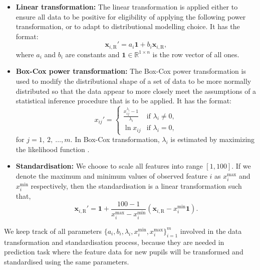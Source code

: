 \begin{itemize}
\item \textbf{Linear transformation:} The linear transformation is applied either to ensure all data to be positive for eligibility of applying the following power transformation, or to adapt to distributional modelling choice. It has the format:
\begin{equation}
\mathbf{x}_{i,\text{R}}' = a_i \mathbf{1} + b_i \mathbf{x}_{i,\text{R}},
\label{eq:linearTransformation}
\end{equation}
where $a_i$ and $b_i$ are constants and $\mathbf{1} \in \mathbb{R}^{1 \times n}$ is the row vector of all ones.
\item \textbf{Box-Cox power transformation:} The Box-Cox power transformation is used to modify the distributional shape of a set of data to be more normally distributed so that the data appear to more closely meet the assumptions of a statistical inference procedure that is to be applied. It has the format:
\begin{equation}
x_{ij}' = 
\begin{cases}
\frac{x_{ij}^{\lambda_i}-1}{\lambda_i} & \text{if } \lambda_i \neq 0, \\
\ln{x_{ij}} & \text{if } \lambda_i = 0,
\end{cases}
\end{equation}
for $j = 1, ~2, ~\dots, m$. In Box-Cox transformation, $\lambda_i$ is estimated by maximizing the likelihood function \cite{Box64ananalysis}.
\item \textbf{Standardisation:} We choose to scale all features into range $[1, 100]$. If we denote the maximum and minimum values of observed feature $i$ as $x_i^\text{max}$ and $x_i^\text{min}$ respectively, then the standardisation is a linear transformation such that,
\begin{equation}
\mathbf{x}_{i,\text{R}}' = \mathbf{1} + \frac{100-1}{x_i^\text{max}-x_i^\text{min}} \left( \mathbf{x}_{i,\text{R}} - x_i^\text{min} \mathbf{1} \right).
\end{equation}
\end{itemize}

We keep track of all parameters $\{ a_i, b_i, \lambda_i, x_i^\text{min}, x_i^\text{max}\}_{i=1}^m$ involved in the data transformation and standardisation process, because they are needed in prediction task where the feature data for new pupils will be transformed and standardised using the same parameters.